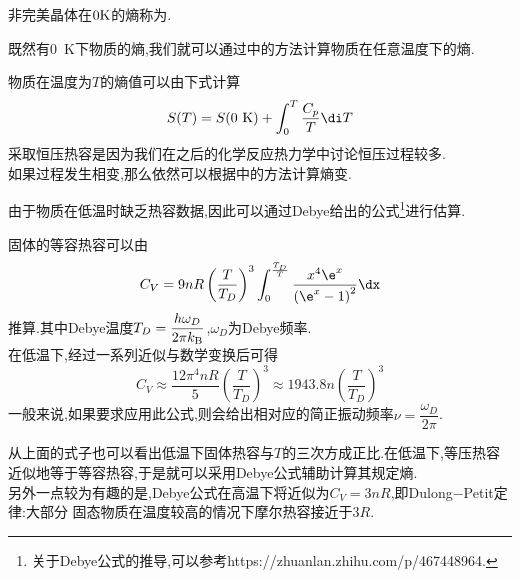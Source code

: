 \documentclass{ctexart}
\begin{document}
\begin{definition}[3D.3.2 残余熵]
    非完美晶体在$0\text K$的熵称为.
\end{definition}
既然有0\ K下物质的熵,我们就可以通过中的方法计算物质在任意温度下的熵.
\begin{theorem}[3D.3.3 规定熵]
    物质在温度为$T$的熵值可以由下式计算
    \[S(T)=S(0\text{ K})+\int_0^{T}\dfrac{C_p}{T}\di T\]
    采取恒压热容是因为我们在之后的化学反应热力学中讨论恒压过程较多.\\
    如果过程发生相变,那么依然可以根据中的方法计算熵变.
\end{theorem}
由于物质在低温时缺乏热容数据,因此可以通过Debye给出的公式\footnote{关于Debye公式的推导,可以参考https://zhuanlan.zhihu.com/p/467448964.}进行估算.
\begin{theorem}[3D.3.4 Debye公式]
    固体的等容热容可以由
    \[C_V=9nR\left(\dfrac{T}{T_D}\right)^3\int_0^{\frac{T_D}{T}}\dfrac{x^4\e^x}{\left(\e^x-1\right)^2}\dx\]
    推算.其中Debye温度$T_D=\dfrac{h\omega_D}{2\pi k_\text B}$,$\omega_D$为Debye频率.\\
    在低温下,经过一系列近似与数学变换后可得
    \[C_V\approx\dfrac{12\pi^4nR}{5}\left(\dfrac{T}{T_D}\right)^3\approx1943.8n\left(\dfrac{T}{T_D}\right)^3\]
    一般来说,如果要求应用此公式,则会给出相对应的简正振动频率$\nu=\dfrac{\omega_D}{2\pi}$.
\end{theorem}
从上面的式子也可以看出低温下固体热容与$T$的三次方成正比.在低温下,等压热容近似地等于等容热容,于是就可以采用Debye公式辅助计算其规定熵.\\
\indent 另外一点较为有趣的是,Debye公式在高温下将近似为$C_V=3nR$,即Dulong$-$Petit定律:大部分%
固态物质在温度较高的情况下摩尔热容接近于$3R$.
\end{document}
